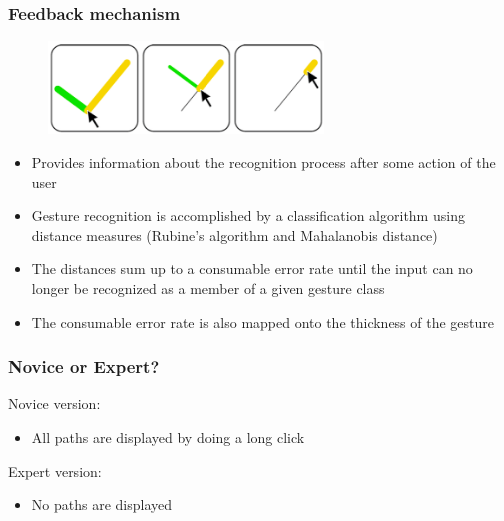 \documentclass{beamer}
\begin{document}

\begin{frame}
\frametitle{Feedback mechanism}

\begin{figure}[H]
\centering
\includegraphics[width=0.65\textwidth]{fb.png}
\end{figure}

\begin{itemize}
\item Provides information about the recognition process after some action of the user 
\pause
\item Gesture recognition is accomplished by a classification algorithm using distance measures (Rubine's algorithm and Mahalanobis distance) 
\pause
\item The distances sum up to a consumable error rate until the input can no longer be recognized as a member of a given gesture class
\pause
\item The consumable error rate is also mapped onto the thickness of the gesture

\end{itemize}
\end{frame}


\begin{frame}
\frametitle{Novice or Expert?}

Novice version: 
\begin{itemize}
\item All paths are displayed by doing a long click \newline
\end{itemize}
\pause

Expert version: 
\begin{itemize}
\item No paths are displayed
\end{itemize}
\end{frame}
\end{document}
